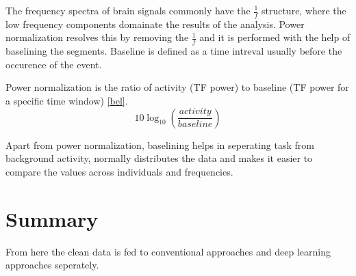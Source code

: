 The frequency spectra of brain signals commonly have the $\frac{1}{f}$ structure, where the low frequency components domainate the results of the analysis. Power 
normalization resolves this by removing the $\frac{1}{f}$ and it is performed with the help of baselining the segments. Baseline is defined as 
a time intreval usually before the occurence of the event.

Power normalization is the ratio of activity (TF power) to baseline (TF power for a specific time window) \ref*{bel}.
\begin{equation} \label{eq:bell}
    10\log_{10}(\frac{activity}{baseline})
\end{equation}

Apart from power normalization, baselining helps in seperating task from background activity, normally distributes the data and makes it easier to compare the values across 
individuals and frequencies.

\section*{Summary}
From here the clean data is fed to conventional approaches and deep learning approaches seperately.
